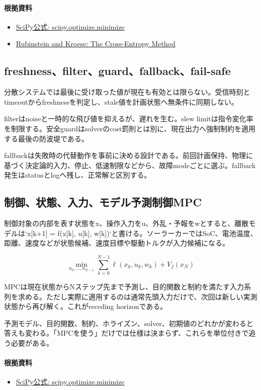 \documentclass[a4paper,11pt]{article}
\begin{document}
\paragraph{根拠資料}
\begin{itemize}[leftmargin=1.6em]
\item \href{https://docs.scipy.org/doc/scipy/reference/generated/scipy.optimize.minimize.html}{SciPy公式: scipy.optimize.minimize}
\item \href{https://link.springer.com/book/10.1007/978-1-4757-4321-0}{Rubinstein and Kroese: The Cross-Entropy Method}
\end{itemize}

\subsection{freshness、filter、guard、fallback、fail-safe}
分散システムでは最後に受け取った値が現在も有効とは限らない。受信時刻とtimeoutからfreshnessを判定し、stale値を計画状態へ無条件に同期しない。


filterはnoiseと一時的な飛び値を抑えるが、遅れを生む。slew limitは指令変化率を制限する。安全guardはsolverのcost罰則とは別に、現在出力へ強制制約を適用する最後の防波堤である。


fallbackは失敗時の代替動作を事前に決める設計である。前回計画保持、物理に基づく決定論的入力、停止、低速制限などから、故障modeごとに選ぶ。fallback発生はstatusとlogへ残し、正常解と区別する。



\subsection{制御、状態、入力、モデル予測制御MPC}
制御対象の内部を表す状態をx、操作入力をu、外乱・予報をwとすると、離散モデルは`x[k+1] = f(x[k], u[k], w[k])`と書ける。ソーラーカーではSoC、電池温度、距離、速度などが状態候補、速度目標や駆動トルクが入力候補になる。


\[
\min_{u_0,\ldots,u_{N-1}} \sum_{k=0}^{N-1}\ell(x_k,u_k,w_k)+V_f(x_N)
\]

MPCは現在状態からNステップ先まで予測し、目的関数と制約を満たす入力系列を求める。ただし実際に適用するのは通常先頭入力だけで、次回は新しい実測状態から再び解く。これがreceding horizonである。


予測モデル、目的関数、制約、ホライズン、solver、初期値のどれかが変わると答えも変わる。「MPCを使う」だけでは仕様は決まらず、これらを単位付きで追う必要がある。

\paragraph{根拠資料}
\begin{itemize}[leftmargin=1.6em]
\item \href{https://docs.scipy.org/doc/scipy/reference/generated/scipy.optimize.minimize.html}{SciPy公式: scipy.optimize.minimize}
\end{itemize}
\end{document}
